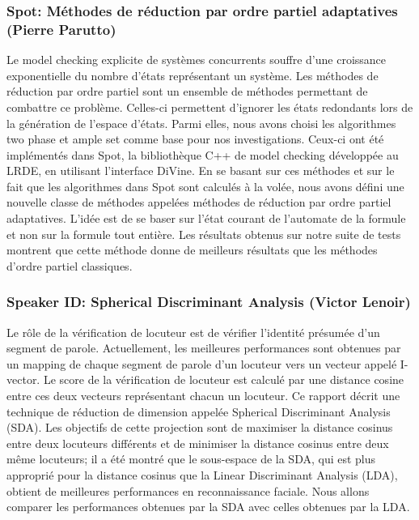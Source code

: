 \documentclass[a4paper,11pt,twoside,final]{article}
\begin{document}
  \subsubsection*{Spot: Méthodes de réduction par ordre partiel adaptatives
  (Pierre Parutto)}

  Le model checking explicite de systèmes concurrents souffre d'une croissance
  exponentielle du nombre d'états représentant un système.  Les méthodes de
  réduction par ordre partiel sont un ensemble de méthodes permettant de
  combattre ce problème. Celles-ci permettent d'ignorer les états redondants
  lors de la génération de l'espace d'états. Parmi elles, nous avons choisi les
  algorithmes two phase et ample set comme base pour nos investigations.
  Ceux-ci ont été implémentés dans Spot, la bibliothèque C++ de model checking
  développée au LRDE, en utilisant l'interface DiVine. En se basant sur ces
  méthodes et sur le fait que les algorithmes dans Spot sont calculés à la
  volée, nous avons défini une nouvelle classe de méthodes appelées méthodes de
  réduction par ordre partiel adaptatives. L'idée est de se baser sur l'état
  courant de l'automate de la formule et non sur la formule tout entière. Les
  résultats obtenus sur notre suite de tests montrent que cette méthode donne
  de meilleurs résultats que les
  méthodes d'ordre partiel classiques.

  \subsubsection*{Speaker ID: Spherical Discriminant Analysis (Victor Lenoir)}

  Le rôle de la vérification de locuteur est de vérifier l'identité présumée
  d'un segment de parole. Actuellement, les meilleures performances sont
  obtenues par un mapping de chaque segment de parole d'un locuteur vers un
  vecteur appelé I-vector. Le score de la vérification de locuteur est calculé
  par une distance cosine entre ces deux vecteurs représentant chacun un
  locuteur. Ce rapport décrit une technique de réduction de dimension appelée
  Spherical Discriminant Analysis (SDA). Les objectifs de cette projection sont
  de maximiser la distance cosinus entre deux locuteurs différents et de
  minimiser la distance cosinus entre deux même locuteurs; il a été montré que
  le sous-espace de la SDA, qui est plus approprié pour la distance cosinus que
  la Linear Discriminant Analysis (LDA), obtient de meilleures performances en
  reconnaissance faciale. Nous allons comparer les performances obtenues par la
  SDA avec celles obtenues par la LDA.
\end{document}
